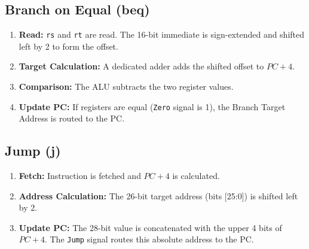 \subsection{Branch on Equal (beq)}
\begin{enumerate}
    \item \textbf{Read:} \texttt{rs} and \texttt{rt} are read. The 16-bit immediate is sign-extended and shifted left by 2 to form the offset.
    \item \textbf{Target Calculation:} A dedicated adder adds the shifted offset to $PC + 4$.
    \item \textbf{Comparison:} The ALU subtracts the two register values.
    \item \textbf{Update PC:} If registers are equal (\texttt{Zero} signal is 1), the Branch Target Address is routed to the PC.
\end{enumerate}

\subsection{Jump (j)}
\begin{enumerate}
    \item \textbf{Fetch:} Instruction is fetched and $PC + 4$ is calculated.
    \item \textbf{Address Calculation:} The 26-bit target address (bits [25:0]) is shifted left by 2.
    \item \textbf{Update PC:} The 28-bit value is concatenated with the upper 4 bits of $PC + 4$. The \texttt{Jump} signal routes this absolute address to the PC.
\end{enumerate}
